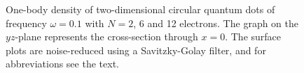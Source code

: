 \begin{figure}
	\hspace{0.1cm}
	\hspace{-0.cm}
	\hspace{-0.cm}
	
	\caption{One-body density of two-dimensional circular quantum dots of frequency $\omega=0.1$ with $N=2$, 6 and 12 electrons. The graph on the $yz$-plane represents the cross-section through $x=0$. The surface plots are noise-reduced using a Savitzky-Golay filter, and for abbreviations see the text.}
	\label{fig:lowfreqRBM}
\end{figure}

